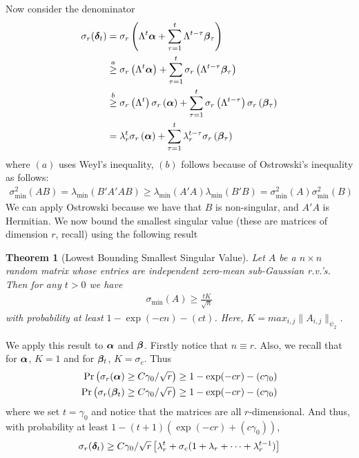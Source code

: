 \documentclass[10pt]{article}
\newtheorem{theorem}{Theorem}
\begin{document}
Now consider the denominator
\begin{align*}
\sigma_r(\bm{\delta}_t) &= \sigma_r\left(\Lambda^t \bm{\alpha} + \sum_{\tau=1}^t \Lambda^{t-\tau} \bm{\beta}_\tau\right) \\
&\overset{a}{\geq}  \sigma_r\left(\Lambda^t \bm{\alpha}\right) + \sum_{\tau=1}^t \sigma_r\left(\Lambda^{t-\tau} \bm{\beta}_\tau\right) \\
&\overset{b}{\geq}  \sigma_r\left(\Lambda^t \right) \sigma_r \left( \bm{\alpha}\right) + \sum_{\tau=1}^t \sigma_r\left(\Lambda^{t-\tau}\right) \sigma_r\left(\bm{\beta}_\tau\right) \\
&= \lambda_r^t \sigma_r\left( \bm{\alpha}\right) + \sum_{\tau=1}^t \lambda_{r}^{t-\tau} \sigma_r\left(\bm{\beta}_\tau\right) 
\end{align*}
where $(a)$ uses Weyl's inequality, $(b)$ follows because of Ostrowski's inequality as follows: 
\begin{align*}
\sigma_{\min}^2(AB) = \lambda_{\min}(B'A'A B) \geq \lambda_{\min}(A'A) \lambda_{\min}(B'B) = \sigma_{\min}^2(A) \sigma_{\min}^2(B)
\end{align*}
We can apply Ostrowski because we have that $B$ is non-singular, and $A'A$ is Hermitian. We now bound the smallest singular value (these are matrices of dimension $r$, recall) using the following result \cite[Theorem 1.2]{smallest}
\begin{theorem}[Lowest Bounding Smallest Singular Value] \label{thm:lower_bnd_square}
Let $A$ be a $n \times n$ random matrix whose entries are independent zero-mean sub-Gaussian r.v.'s. Then for any $t >0$ we have 
\begin{align*}
\sigma_{\min}(A) \geq \frac{t K}{\sqrt n}
\end{align*}
with probability at least $1 -  \exp(-c n) - (ct)$. Here, $K = max_{i,j} \|A_{i,j}\|_{\psi_2}$. 
\end{theorem}
We apply this result to $\bm{\alpha}$ and $\bm{\beta}$. Firstly notice that $n \equiv r$. Also, we recall that for $\bm{\alpha}$, $K = 1$ and for $\bm{\beta}_t$, $K = \sigma_c$. Thus
\begin{align*}
\Pr\left(\sigma_{r}(\bm{\alpha}) \geq C \gamma_0/\sqrt{r}\right) \geq  1 - \exp(-cr) - (c \gamma_0) \\
\Pr\left(\sigma_{r}(\bm{\beta}_t) \geq C \gamma_0/\sqrt{r}\right) \geq  1 - \exp(-cr) - (c \gamma_0)
\end{align*}
where we set $t = \gamma_0$ and notice that the matrices are all $r$-dimensional. And thus, with probability at least $1 - (t+1) (\exp(-cr) + (c\gamma_0))$, 
\begin{align*}
\sigma_r(\bm{\delta}_t) \geq C \gamma_0/\sqrt{r} \left[ \lambda_r^t + \sigma_c (1 + \lambda_r + \cdots + \lambda_r^{t-1})\right]
\end{align*}
\end{document}
